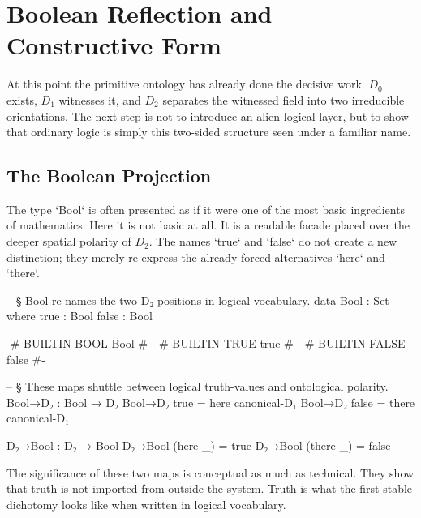 \documentclass[11pt,a4paper]{book}
\begin{document}
\chapter{Boolean Reflection and Constructive Form}

At this point the primitive ontology has already done the decisive work. $D_0$ exists, $D_1$ witnesses it, and $D_2$ separates the witnessed field into two irreducible orientations. The next step is not to introduce an alien logical layer, but to show that ordinary logic is simply this two-sided structure seen under a familiar name.

\section{The Boolean Projection}

The type `Bool` is often presented as if it were one of the most basic ingredients of mathematics. Here it is not basic at all. It is a readable facade placed over the deeper spatial polarity of $D_2$. The names `true` and `false` do not create a new distinction; they merely re-express the already forced alternatives `here` and `there`.

\begin{code}
-- § Bool re-names the two D₂ positions in logical vocabulary.
data Bool : Set where
  true  : Bool
  false : Bool

{-# BUILTIN BOOL  Bool  #-}
{-# BUILTIN TRUE  true  #-}
{-# BUILTIN FALSE false #-}

-- § These maps shuttle between logical truth-values and ontological polarity.
Bool→D₂ : Bool → D₂
Bool→D₂ true  = here canonical-D₁
Bool→D₂ false = there canonical-D₁

D₂→Bool : D₂ → Bool
D₂→Bool (here _)  = true
D₂→Bool (there _) = false
\end{code}

The significance of these two maps is conceptual as much as technical. They show that truth is not imported from outside the system. Truth is what the first stable dichotomy looks like when written in logical vocabulary.

\begin{center}
\end{center}
\end{document}

